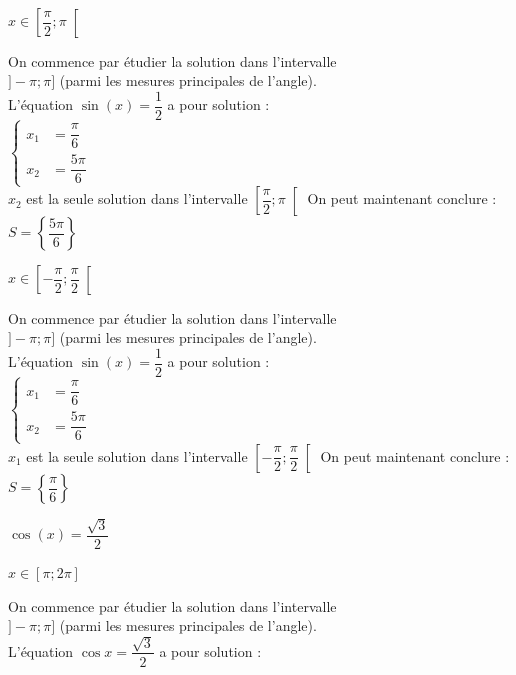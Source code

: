 \documentclass[11pt,a4paper]{article}  %
\begin{document}
\begin{enumMet}
\begin{enumMet}
				\item $x \in\left[\dfrac{\pi}{2} ; \pi \right[$
				\begin{corrBox}
					On commence par étudier la solution dans l'intervalle\\ $]-\pi;\pi]$ (parmi les mesures principales de l'angle).\\
					L'équation $\sin (x)=\dfrac{1}{2}$ a pour solution :\\
					$\begin{cases}
						x_1 &=\dfrac{\pi}{6}\\
						x_2 &=\dfrac{5\pi}{6}
					\end{cases}$\\
					$x_2$ est la seule solution dans l'intervalle $\left[\dfrac{\pi}{2} ; \pi \right[$
					On peut maintenant conclure : $S=\left\{\dfrac{5\pi}{6}\right\}$	
				\end{corrBox}
				\item $x \in\left[-\dfrac{\pi}{2} ; \dfrac{\pi}{2} \right[$
				\begin{corrBox}
					On commence par étudier la solution dans l'intervalle\\ $]-\pi;\pi]$ (parmi les mesures principales de l'angle).\\
					L'équation $\sin (x)=\dfrac{1}{2}$ a pour solution :\\
					$\begin{cases}
						x_1 &=\dfrac{\pi}{6}\\
						x_2 &=\dfrac{5\pi}{6}
					\end{cases}$\\
					$x_1$ est la seule solution dans l'intervalle $\left[-\dfrac{\pi}{2} ; \dfrac{\pi}{2} \right[$
					On peut maintenant conclure : $S=\left\{\dfrac{\pi}{6}\right\}$	
				\end{corrBox}
			\end{enumMet}
		\item $\cos (x)=\dfrac{\sqrt{3}}{2}$
			\begin{enumMet}
				\item $x \in[\pi ; 2 \pi]$
				\begin{corrBox}
					On commence par étudier la solution dans l'intervalle\\ $]-\pi;\pi]$ (parmi les mesures principales de l'angle).\\
					L'équation $\cos x=\dfrac{\sqrt{3}}{2}$ a pour solution :\\

\end{corrBox}
\end{enumMet}
\end{enumMet}
\end{document}
